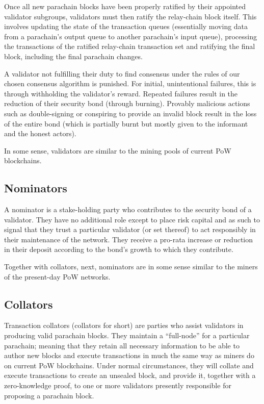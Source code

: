 \documentclass[9pt,oneside]{amsart}
\begin{document}
\begin{multicols}{2}
 Once all new parachain blocks have been properly ratified by their appointed validator subgroups, validators must then ratify the relay-chain block itself. This involves updating the state of the transaction queues (essentially moving data from a parachain's output queue to another parachain's input queue), processing the transactions of the ratified relay-chain transaction set and ratifying the final block, including the final parachain changes.

 A validator not fulfilling their duty to find consensus under the rules of our chosen consensus algorithm is punished. For initial, unintentional failures, this is through withholding the validator's reward. Repeated failures result in the reduction of their security bond (through burning). Provably malicious actions such as double-signing or conspiring to provide an invalid block result in the loss of the entire bond (which is partially burnt but mostly given to the informant and the honest actors).

 In some sense, validators are similar to the mining pools of current PoW blockchains.

\subsection{Nominators}
\label{nominators}

 A nominator is a stake-holding party who contributes to the security bond of a validator. They have no additional role except to place risk capital and as such to signal that they trust a particular validator (or set thereof) to act responsibly in their maintenance of the network. They receive a pro-rata increase or reduction in their deposit according to the bond's growth to which they contribute.

 Together with collators, next, nominators are in some sense similar to the miners of the present-day PoW networks.

\subsection{Collators}
\label{collators}

 Transaction collators (collators for short) are parties who assist validators in producing valid parachain blocks. They maintain a ``full-node'' for a particular parachain; meaning that they retain all necessary information to be able to author new blocks and execute transactions in much the same way as miners do on current PoW blockchains. Under normal circumstances, they will collate and execute transactions to create an unsealed block, and provide it, together with a zero-knowledge proof, to one or more validators presently responsible for proposing a parachain block.


\end{multicols}
\end{document}
